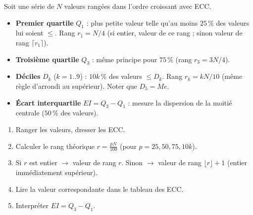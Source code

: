 \documentclass[11pt]{article}
\begin{document}
\begin{definition}
Soit une série de $N$ valeurs rangées dans l'ordre croissant avec ECC.
\begin{itemize}
\item \textbf{Premier quartile} $Q_1$ : plus petite valeur telle qu'au moins $25\,\%$ des valeurs lui soient $\le$. Rang $r_1 = N/4$ (si entier, valeur de ce rang ; sinon valeur de rang $\lceil r_1 \rceil$).
\item \textbf{Troisième quartile} $Q_3$ : même principe pour $75\,\%$ (rang $r_3 = 3N/4$).
\item \textbf{Déciles} $D_k$ ($k=1..9$) : $10k\,\%$ des valeurs $\le D_k$. Rang $r_k = kN/10$ (même règle d'arrondi au supérieur). Noter que $D_5 = Me$.
\item \textbf{Écart interquartile} $EI = Q_3 - Q_1$ : mesure la dispersion de la moitié centrale ($50\,\%$ des valeurs).
\end{itemize}
\end{definition}

\begin{methode}[Déterminer $Q_1$, $Me$, $Q_3$, $D_k$]
\begin{enumerate}
\item Ranger les valeurs, dresser les ECC.
\item Calculer le rang théorique $r = \frac{pN}{100}$ (pour $p=25, 50, 75, 10k$).
\item Si $r$ est entier $\rightarrow$ valeur de rang $r$. Sinon $\rightarrow$ valeur de rang $\lfloor r \rfloor + 1$ (entier immédiatement supérieur).
\item Lire la valeur correspondante dans le tableau des ECC.
\item Interpréter $EI = Q_3 - Q_1$.
\end{enumerate}
\end{methode}
\end{document}
